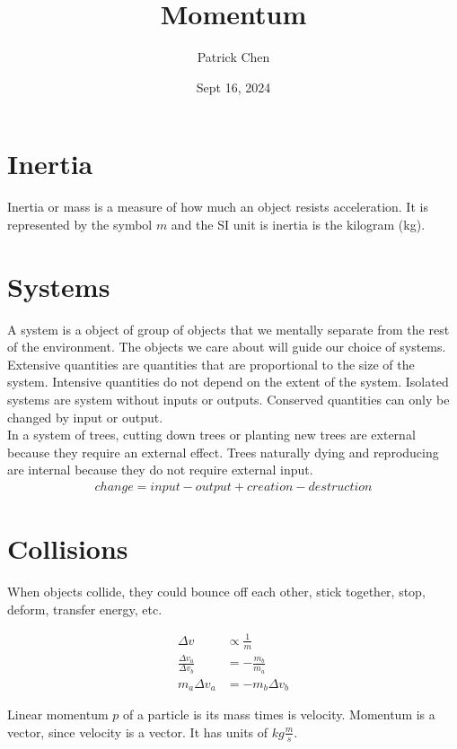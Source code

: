\documentclass{article}
\title{Momentum}
\author{Patrick Chen}
\date{Sept 16, 2024}
\theoremstyle{mytheoremstyle}
\theoremstyle{mytheoremstyle}
\theoremstyle{myproblemstyle}
\begin{document}
    \maketitle
    \section*{Inertia}
    Inertia or mass is a measure of how much an object resists acceleration. It
    is represented by the symbol $m$ and the SI unit is inertia is the kilogram
    (kg).

    \section*{Systems}
    A system is a object of group of objects that we mentally separate from the
    rest of the environment. The objects we care about will guide our choice of
    systems. Extensive quantities are quantities that are proportional to the
    size of the system. Intensive quantities do not depend on the extent of the
    system. Isolated systems are system without inputs or outputs. Conserved
    quantities can only be changed by input or output. \\
    In a system of trees, cutting down trees or planting new trees are external
    because they require an external effect. Trees naturally dying and
    reproducing are internal because they do not require external input.
    \begin{align*}
        change = input-output+creation-destruction
    \end{align*}

    \section*{Collisions}
    When objects collide, they could bounce off each other, stick together,
    stop, deform, transfer energy, etc. 

    \begin{align*}
        \Delta v &\propto \frac{1}{m} \\
        \frac{\Delta v_a}{\Delta v_b} &= -\frac{m_b}{m_a} \\
        m_a \Delta v_a &= - m_b \Delta v_b
    \end{align*}

    Linear momentum $p$ of a particle is its mass times is velocity. Momentum is
    a vector, since velocity is a vector. It has units of $kg \frac{m}{s}$.
\end{document}
